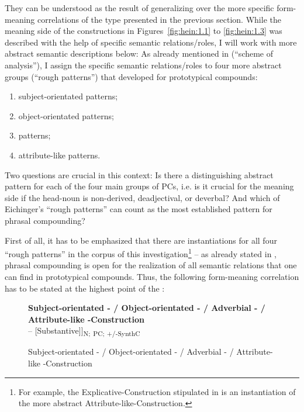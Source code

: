 \documentclass[output=paper]{LSP/langsci}
\begin{document}
They can be understood as the result of generalizing over the more specific form-meaning correlations of the type presented in the previous section.  While the meaning side of the constructions in Figures~\ref{fig:hein:1.1} to \ref{fig:hein:1.3} was described with the help of specific semantic relations\slash roles, I will work with more abstract semantic descriptions below: As already mentioned in  (``scheme of analysis''), I assign the specific semantic relations\slash roles to four more abstract groups (``rough patterns'') that \citet[36 f.; 118 ff.; 184]{Eichinger2000} developed for prototypical compounds: 
\begin{enumerate}
\item subject-orientated patterns; 
\item object-orientated patterns;  
\item {} patterns; 
\item attribute-like patterns.
\end{enumerate}

Two questions are crucial in this context: Is there a distinguishing abstract pattern for each of the four main groups of PCs, i.e. is it crucial for the meaning side if the head-noun is non-derived, deadjectival,  or deverbal? And which of Eichinger’s ``rough patterns'' can count as the most established pattern for phrasal compounding?

First of all, it has to be emphasized that there are instantiations for all four ``rough patterns'' in the corpus of this investigation\footnote{For example, the Explicative-Construction stipulated in  is an instantiation of the more abstract Attribute-like-Construction.} -- as already stated in , phrasal compounding is open for the realization of all semantic relations that one can find in prototypical  compounds. Thus, the following form-meaning correlation has to be stated at the highest point of the :  


\begin{figure}
\caption{Subject-orientated - / Object-orientated - / Adverbial - / Attribute-like -Construction\label{fig:hein:1.4}}
\begin{framed}\raggedright
\textbf{Subject-orientated - / Object-orientated - / Adverbial - / Attribute-like -Construction}\\
\noindent
[[Syntagma] -- [Substantive]]\textsubscript{N;} \textsubscript{PC; +/-SynthC}\footnotemark
\end{framed}
\end{figure}
\end{document}
